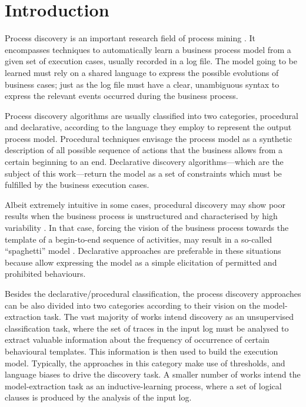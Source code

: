 
\section{Introduction}
\label{sec:intro}
Process discovery  is an important research field of process mining \cite{2012-Aalst}. It encompasses techniques to automatically learn a business process model from a given set of execution cases, usually recorded in a log file.
The model going to be learned must rely on a shared language to express the possible evolutions of business cases; just as the log file must have a clear, unambiguous syntax to express the relevant events occurred during the business process.

Process discovery algorithms are usually classified into two categories, procedural and declarative, according to the language they employ to represent the output process model.
Procedural techniques envisage the process model as a synthetic description of all possible sequence of actions that the business allows from a certain beginning to an end. Declarative discovery algorithms---which are the subject of this work---return the model as a set of constraints which must be fulfilled by the business execution cases. 

Albeit extremely intuitive in some cases, procedural discovery may show poor results when the business process is unstructured and characterised by high variability \cite{2009-Fahland}. 
In that case, forcing the vision of the business process towards the template of a begin-to-end sequence of activities, may result in a so-called ``spaghetti'' model \cite{2018b-Maggi}. Declarative approaches are preferable in these situations because allow expressing the model as a simple elicitation of permitted and prohibited behaviours.


Besides the declarative/procedural classification, the process discovery approaches can be also divided into two categories according to their vision on the model-extraction task. 
The vast majority of works \cite{2004-Aalst,2003-Weijters,2007-Gunther,2010-Aalst} intend discovery as an unsupervised classification task, where the set of traces in the input log must be analysed to extract valuable information about the frequency of occurrence of certain behavioural templates. This information is then used to build the execution model. Typically, the approaches in this category make use of thresholds, and language biases to drive the discovery task. 
A smaller number of works \cite{2015-Guo,2007-Lamma,2009-Chesani} intend the model-extraction task as an inductive-learning process, where a set of logical clauses is produced by the analysis of the input log. 
 
